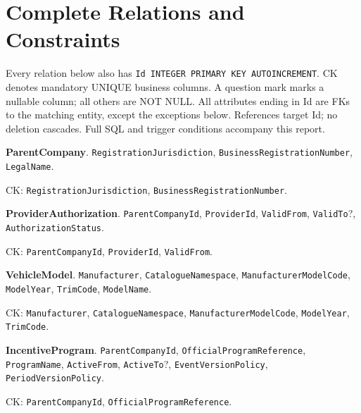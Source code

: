 \section*{Complete Relations and Constraints}
\fontsize{7}{8}\selectfont\raggedright
Every relation below also has \texttt{Id INTEGER PRIMARY KEY AUTOINCREMENT}. CK denotes mandatory UNIQUE business columns. A question mark marks a nullable column; all others are NOT NULL. All attributes ending in Id are FKs to the matching entity, except the exceptions below. References target Id; no deletion cascades. Full SQL and trigger conditions accompany this report.
\par\vspace{2.0pt}\noindent\textbf{ParentCompany}. \texttt{Registration\allowbreak{}Jurisdiction}, \texttt{Business\allowbreak{}Registration\allowbreak{}Number}, \texttt{Legal\allowbreak{}Name}.\par\noindent CK: \texttt{Registration\allowbreak{}Jurisdiction}, \texttt{Business\allowbreak{}Registration\allowbreak{}Number}.
\par\vspace{2.0pt}\noindent\textbf{ProviderAuthorization}. \texttt{Parent\allowbreak{}Company\allowbreak{}Id}, \texttt{Provider\allowbreak{}Id}, \texttt{Valid\allowbreak{}From}, \texttt{Valid\allowbreak{}To}?, \texttt{Authorization\allowbreak{}Status}.\par\noindent CK: \texttt{Parent\allowbreak{}Company\allowbreak{}Id}, \texttt{Provider\allowbreak{}Id}, \texttt{Valid\allowbreak{}From}.
\par\vspace{2.0pt}\noindent\textbf{VehicleModel}. \texttt{Manufacturer}, \texttt{Catalogue\allowbreak{}Namespace}, \texttt{Manufacturer\allowbreak{}Model\allowbreak{}Code}, \texttt{Model\allowbreak{}Year}, \texttt{Trim\allowbreak{}Code}, \texttt{Model\allowbreak{}Name}.\par\noindent CK: \texttt{Manufacturer}, \texttt{Catalogue\allowbreak{}Namespace}, \texttt{Manufacturer\allowbreak{}Model\allowbreak{}Code}, \texttt{Model\allowbreak{}Year}, \texttt{Trim\allowbreak{}Code}.
\par\vspace{2.0pt}\noindent\textbf{IncentiveProgram}. \texttt{Parent\allowbreak{}Company\allowbreak{}Id}, \texttt{Official\allowbreak{}Program\allowbreak{}Reference}, \texttt{Program\allowbreak{}Name}, \texttt{Active\allowbreak{}From}, \texttt{Active\allowbreak{}To}?, \texttt{Event\allowbreak{}Version\allowbreak{}Policy}, \texttt{Period\allowbreak{}Version\allowbreak{}Policy}.\par\noindent CK: \texttt{Parent\allowbreak{}Company\allowbreak{}Id}, \texttt{Official\allowbreak{}Program\allowbreak{}Reference}.
